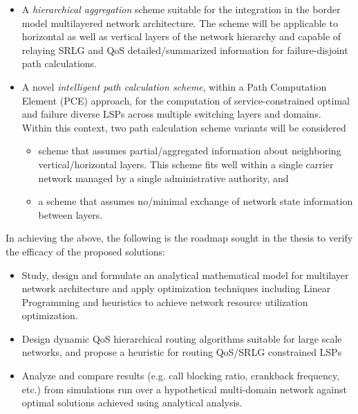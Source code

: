 \begin{itemize}
\item A  \emph{hierarchical aggregation} scheme suitable for the integration in the border model multilayered network architecture. The scheme will be applicable to horizontal as well as vertical layers of the network hierarchy and capable of relaying SRLG and QoS detailed/summarized information for failure-disjoint path calculations.

\item A novel \emph{intelligent path calculation scheme}, within a Path Computation Element (PCE) approach, for the computation of service-constrained optimal and failure diverse LSPs across multiple switching layers and domains. Within this context, two path calculation scheme variants will be considered

\begin{itemize}
\item	scheme that assumes partial/aggregated information about neighboring vertical/horizontal layers. This scheme fits well within a single carrier network managed by a single administrative authority, and

\item a scheme that assumes no/minimal exchange of network state information between layers. 
\end{itemize}
\end{itemize}

In achieving the above, the following is the roadmap sought in the thesis to verify the efficacy of the proposed solutions:

\begin{itemize}
\item Study, design and formulate an analytical mathematical model for multilayer network architecture and apply optimization techniques including Linear Programming and heuristics to achieve network resource utilization optimization.

\item Design dynamic QoS hierarchical routing algorithms suitable for large scale networks, and propose a heuristic for routing QoS/SRLG constrained LSPs

\item Analyze and compare results (e.g. call blocking ratio, crankback frequency, etc.) from simulations run over a hypothetical multi-domain network against optimal solutions achieved using analytical analysis.

\end{itemize}


